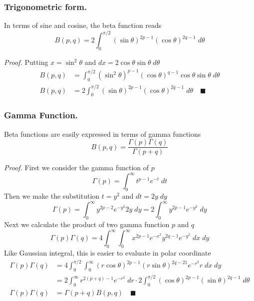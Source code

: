 \documentclass[../main.tex]{subfiles}
\begin{document}
\subsubsection*{Trigonometric form.} In terms of sine and cosine, the beta function reads 
\begin{equation*}
    B(p,q)=2\int_{0}^{\pi/2}(\sin \theta)^{2p-1}(\cos\theta)^{2q-1}\;d\theta
\end{equation*}

\emph{Proof.} Putting $x=\sin^2\theta$ and $dx=2\cos\theta\sin\theta\;d\theta$
\begin{align*}
    B(p,q)&=\int_{0}^{\pi/2} (\sin^2\theta)^{p-1}(\cos\theta)^{q-1} \cos\theta\sin\theta\;d\theta\\
    B(p,q)&=2\int_{0}^{\pi/2} (\sin \theta)^{2p-1}(\cos\theta)^{2q-1}\;d\theta\quad\blacksquare
\end{align*}

\subsubsection*{Gamma Function.}  Beta functions are easily expressed in terms of gamma functions
\begin{equation*}
    B(p,q)=\frac{\Gamma(p)\Gamma(q)}{\Gamma(p+q)}
\end{equation*}

\emph{Proof.} First we consider the gamma function of $p$
\begin{equation*}
    \Gamma(p)=\int_{0}^{\infty}t^{p-1}e^{-t}\;dt
\end{equation*}
Then we make the substitution $t=y^2$ and $dt=2y\;dy$
\begin{equation*}
    \Gamma(p)=\int_{0}^{\infty}y^{2p-2}e^{-y^2}2y\;dy=2\int_{0}^{\infty}y^{2p-1}e^{-y^2}\;dy
\end{equation*}
Next we calculate the product of two gamma function $p$ and $q$
\begin{equation*}
    \Gamma(p)\Gamma(q)=4\int_{0}^{\infty}\int_{0}^{\infty} x^{2p-1}e^{-x^2} y^{2q-1}e^{-y^2}\;dx\;dy
\end{equation*}
Like Gaussian integral, this is easier to evaluate in polar coordinate
\begin{align*}
    \Gamma(p)\Gamma(q)&=4\int_{0}^{\pi/2}\int_{0}^{\infty} (r\cos\theta)^{2p-1} (r\sin\theta)^{2q-21}e^{-r^2}r\;dx\;dy\\
    &=2\int_{0}^{\infty}r^{2(p+q)-1}e^{-r^2}\;dr\cdot 2\int_{0}^{\pi/2} (\cos\theta)^{2p-1}(\sin\theta)^{2q-1}\;d\theta\\
    \Gamma(p)\Gamma(q)&=\Gamma(p+q)B(p,q)\quad\blacksquare
\end{align*}
\end{document}
